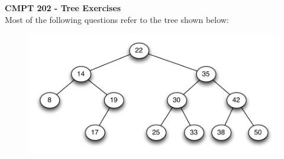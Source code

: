 \documentclass[11pt]{article}
\begin{document}
{\large {\bf CMPT 202 - Tree Exercises}} \\

Most of the following questions refer to the tree shown below:





\begin{figure}[h]

\centerline {
\includegraphics[width=5in]{TreeExerciseGraph.pdf}
}
\label{fig:fig1}
\end{figure}
\end{document}
